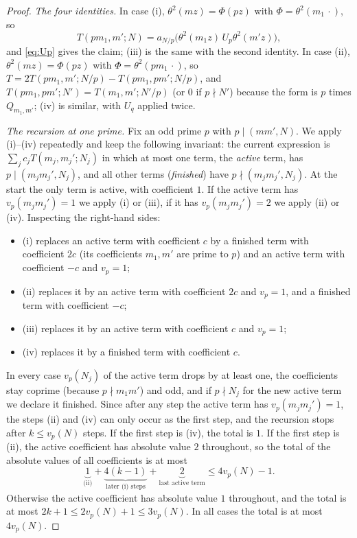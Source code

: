 \documentclass[11pt]{amsart}
\theoremstyle{remark}
\begin{document}
\begin{proof}
\emph{The four identities.} In case (i), $\theta^2(mz)=\Phi(pz)$ with $\Phi=\theta^2(m_1\,\cdot)$, so
\[
T(pm_1,m';N)=a_{N/p}\bigl(\theta^2(m_1z)\,U_p\theta^2(m'z)\bigr),
\]
and \eqref{eq:Up} gives the claim; (iii) is the same with the second identity. In case (ii), $\theta^2(mz)=\Phi(pz)$ with $\Phi=\theta^2(pm_1\,\cdot)$, so $T=2T(pm_1,m';N/p)-T(pm_1,pm';N/p)$, and $T(pm_1,pm';N')=T(m_1,m';N'/p)$ (or $0$ if $p\nmid N'$) because the form is $p$ times $Q_{m_1,m'}$; (iv) is similar, with $U_q$ applied twice.

\emph{The recursion at one prime.} Fix an odd prime $p$ with $p\mid(mm',N)$. We apply (i)--(iv) repeatedly and keep the following invariant: the current expression is $\sum_jc_jT(m_j,m_j';N_j)$ in which at most one term, the \emph{active} term, has $p\mid(m_jm_j',N_j)$, and all other terms (\emph{finished}) have $p\nmid(m_jm_j',N_j)$. At the start the only term is active, with coefficient $1$. If the active term has $v_p(m_jm_j')=1$ we apply (i) or (iii), if it has $v_p(m_jm_j')=2$ we apply (ii) or (iv). Inspecting the right-hand sides:
\begin{itemize}[leftmargin=2em]
\item (i) replaces an active term with coefficient $c$ by a finished term with coefficient $2c$ (its coefficients $m_1,m'$ are prime to $p$) and an active term with coefficient $-c$ and $v_p=1$;
\item (ii) replaces it by an active term with coefficient $2c$ and $v_p=1$, and a finished term with coefficient $-c$;
\item (iii) replaces it by an active term with coefficient $c$ and $v_p=1$;
\item (iv) replaces it by a finished term with coefficient $c$.
\end{itemize}
In every case $v_p(N_j)$ of the active term drops by at least one, the coefficients stay coprime (because $p\nmid m_1m'$) and odd, and if $p\nmid N_j$ for the new active term we declare it finished. Since after any step the active term has $v_p(m_jm_j')=1$, the steps (ii) and (iv) can only occur as the first step, and the recursion stops after $k\le v_p(N)$ steps. If the first step is (iv), the total is $1$. If the first step is (ii), the active coefficient has absolute value $2$ throughout, so the total of the absolute values of all coefficients is at most
\[
\underbrace{1}_{\text{(ii)}}+\underbrace{4(k-1)}_{\text{later (i) steps}}+\underbrace{2}_{\text{last active term}}\le 4v_p(N)-1.
\]
Otherwise the active coefficient has absolute value $1$ throughout, and the total is at most $2k+1\le 2v_p(N)+1\le 3v_p(N)$. In all cases the total is at most $4v_p(N)$.


\end{proof}
\end{document}
